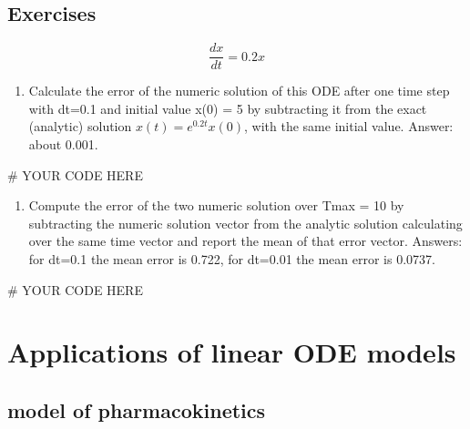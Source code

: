 \documentclass[
  letterpaper,
  DIV=11,
  numbers=noendperiod]{scrreprt}
\newenvironment{Shaded}{\begin{snugshade}}{\end{snugshade}}
\newcommand{\CommentTok}[1]{\textcolor[rgb]{0.37,0.37,0.37}{#1}}
\providecommand{\tightlist}{%
  \setlength{\itemsep}{0pt}\setlength{\parskip}{0pt}}\usepackage{longtable,booktabs,array}
\begin{document}
\hypertarget{exercises-19}{%
\subsection{Exercises}\label{exercises-19}}

\[
\frac{dx}{dt} =  0.2 x 
\]

\begin{enumerate}
\def\labelenumi{\arabic{enumi}.}
\tightlist
\item
  Calculate the error of the numeric solution of this ODE after one time
  step with dt=0.1 and initial value x(0) = 5 by subtracting it from the
  exact (analytic) solution \(x(t) = e^{0.2t}x(0)\), with the same
  initial value. Answer: about 0.001.
\end{enumerate}

\begin{Shaded}
\begin{Highlighting}[]
\CommentTok{\# YOUR CODE HERE}
\end{Highlighting}
\end{Shaded}

\begin{enumerate}
\def\labelenumi{\arabic{enumi}.}
\setcounter{enumi}{1}
\tightlist
\item
  Compute the error of the two numeric solution over Tmax = 10 by
  subtracting the numeric solution vector from the analytic solution
  calculating over the same time vector and report the mean of that
  error vector. Answers: for dt=0.1 the mean error is 0.722, for dt=0.01
  the mean error is 0.0737.
\end{enumerate}

\begin{Shaded}
\begin{Highlighting}[]
\CommentTok{\# YOUR CODE HERE}
\end{Highlighting}
\end{Shaded}

\hypertarget{applications-of-linear-ode-models}{%
\section{Applications of linear ODE
models}\label{applications-of-linear-ode-models}}

\label{sec:bio15}

\hypertarget{model-of-pharmacokinetics}{%
\subsection{model of pharmacokinetics}\label{model-of-pharmacokinetics}}
\end{document}
